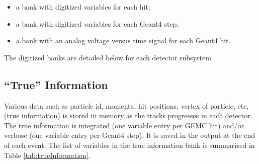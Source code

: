 \begin{itemize}
	\item a bank with digitized variables for each hit;
	\item a bank with digitized variables for each Geant4 step;
	\item a bank with an analog voltage versus time signal for each Geant4 hit.
\end{itemize}

The digitized banks are detailed below for each detector subsystem.

\subsection{``True'' Information}

Various data such as particle id, momenta, hit positions, vertex of particle, etc, (true information) is stored in memory
as the tracks progresses in each detector. The true information is integrated (one variable entry per GEMC hit) and/or
verbose (one variable entry per Geant4 step). It is saved in the output at the end of each event.
The list of variables in the true information bank is summarized in Table \ref{tab:trueInformation}.

